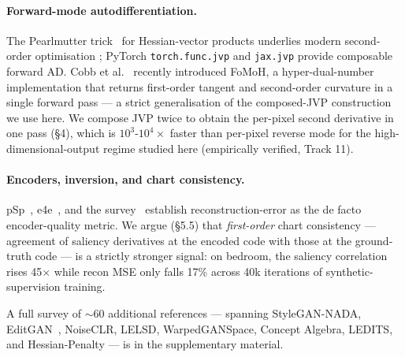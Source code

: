\paragraph{Forward-mode autodifferentiation.}
The Pearlmutter trick~\cite{Pearlmutter1994HVP} for Hessian-vector
products underlies modern second-order optimisation
\cite{Martens2015KFAC}; PyTorch \texttt{torch.func.jvp} and
\texttt{jax.jvp} provide composable forward AD. Cobb et
al.~\cite{Cobb2025FoMoH} recently introduced FoMoH, a hyper-dual-number
implementation that returns first-order tangent and second-order
curvature in a single forward pass --- a strict generalisation of the
composed-JVP construction we use here.
We compose JVP twice to obtain the per-pixel second derivative in
one pass (§4), which is $10^3$-$10^4 \times$ faster than per-pixel
reverse mode for the high-dimensional-output regime studied here
(empirically verified, Track 11).

\paragraph{Encoders, inversion, and chart consistency.}
pSp~\cite{Richardson2021pSp}, e4e~\cite{Tov2021e4e}, and the
survey~\cite{Xia2022InversionSurvey} establish reconstruction-error
as the de facto encoder-quality metric. We argue (§5.5) that
\emph{first-order} chart consistency --- agreement of saliency
derivatives at the encoded code with those at the ground-truth code
--- is a strictly stronger signal: on bedroom, the saliency
correlation rises 45$\times$ while recon MSE only falls 17\% across
40k iterations of synthetic-supervision training.

A full survey of $\sim$60 additional references --- spanning
StyleGAN-NADA, EditGAN~\cite{Ling2021EditGAN}, NoiseCLR, LELSD,
WarpedGANSpace, Concept Algebra, LEDITS, and Hessian-Penalty --- is
in the supplementary material.
